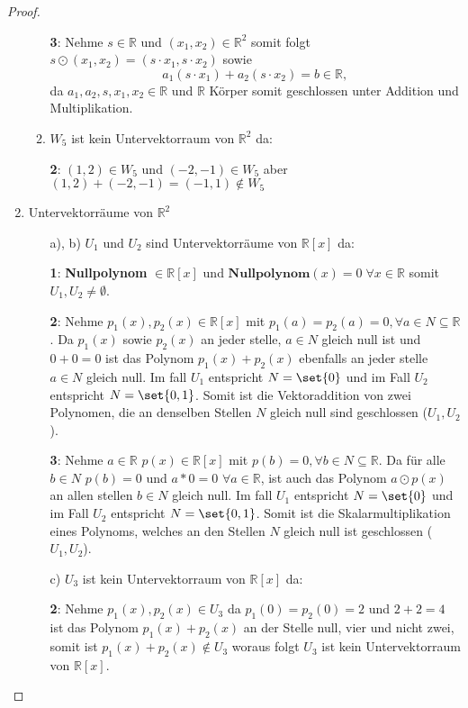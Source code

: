 \documentclass{../problemset}
\begin{document}
\begin{problem}
\begin{proof}
\begin{enumerate}
\begin{enumerate}[label=\alph*)]
			            \textbf{3}: Nehme $s \in \mathbb{R}$ und $(x_1, x_2) \in \mathbb{R}^2$ somit folgt $s \odot (x_1, x_2) = (s \cdot x_1, s \cdot x_2)$ sowie \[
				            a_1(s \cdot x_1) + a_2(s \cdot x_2) = b \in \mathbb{R},
			            \] da $a_1,a_2, s,x_1,x_2 \in \mathbb{R}$ und $\mathbb{R}$ Körper somit geschlossen unter Addition und Multiplikation.
			      \item $W_5$ ist kein Untervektorraum von $\mathbb{R}^2$ da:

			            \textbf{2}: $(1, 2) \in W_5$ und $(-2, -1) \in W_5$ aber $(1, 2) + (-2, -1) = (-1, 1) \not\in W_5$
		      \end{enumerate}
		\item Untervektorräume von $\mathbb{R}^2$

		      \begin{enumerate}
			      \item [a), b)] $U_1$ und $U_2$ sind Untervektorräume von $\mathbb{R}[x]$ da:

			            \textbf{1}: \textbf{Nullpolynom} $\in \mathbb{R}[x]$ und $\textbf{Nullpolynom}(x) = 0 \; \forall x \in \mathbb{R}$ somit $U_1, U_2 \neq \emptyset$. \checkmark

			            \textbf{2}: Nehme $p_1(x), p_2(x) \in \mathbb{R}[x]$ mit $p_1(a) = p_2(a) = 0, \forall a \in N \subseteq \mathbb{R}$.
			            Da $p_1(x)$ sowie $p_2(x)$ an jeder stelle, $a \in N$ gleich null ist und $0 + 0 = 0$ ist das Polynom $p_1(x) + p_2(x)$ ebenfalls an jeder stelle $a \in N$ gleich null.
			            Im fall $U_1$ entspricht $N = \set{0}$ und im Fall $U_2$ entspricht $N = \set{0, 1}$.
			            Somit ist die Vektoraddition von zwei Polynomen, die an denselben Stellen $N$ gleich null sind geschlossen ($U_1, U_2$). \checkmark

			            \textbf{3}: Nehme $a \in \mathbb{R}$ $p(x) \in \mathbb{R}[x]$ mit $p(b)= 0, \forall b \in N \subseteq \mathbb{R}$.
			            Da für alle $b \in N$ $p(b) = 0$ und $a * 0 = 0$ $\forall a \in \mathbb{R}$, ist auch das Polynom $a \odot p(x)$ an allen stellen $b \in N$ gleich null.
			            Im fall $U_1$ entspricht $N = \set{0}$ und im Fall $U_2$ entspricht $N = \set{0, 1}$.
			            Somit ist die Skalarmultiplikation eines Polynoms, welches an den Stellen $N$ gleich null ist geschlossen ($U_1, U_2$). \checkmark
			      \item [c)] $U_3$ ist kein Untervektorraum von $\mathbb{R}[x]$ da:

			            \textbf{2}: Nehme $p_1(x), p_2(x) \in U_3$ da $p_1(0) = p_2(0) = 2$ und $2 + 2 = 4$
			            ist das Polynom $p_1(x) + p_2(x)$ an der Stelle null, vier und nicht zwei, somit ist $p_1(x) + p_2(x) \not \in U_3$
			            woraus folgt $U_3$ ist kein Untervektorraum von $\mathbb{R}[x]$.
		      \end{enumerate}
	\end{enumerate}


\end{proof}
\end{problem}
\end{document}
